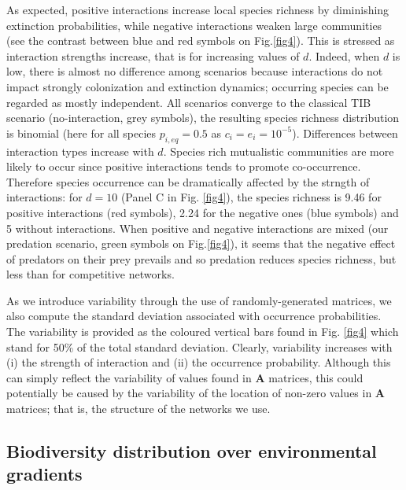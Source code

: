 As expected, positive interactions increase local species richness by diminishing extinction probabilities, while negative interactions weaken large communities (see the contrast between blue and red symbols on Fig.\ref{fig4}). This is stressed as interaction strengths increase, that is for increasing values of $d$. Indeed, when $d$ is low, there is almost no difference among scenarios because interactions do not impact strongly colonization and extinction dynamics; occurring species can be regarded as mostly independent. All scenarios converge to the classical TIB scenario (no-interaction, grey symbols), the resulting species richness distribution is binomial (here for all species $p_{i,eq}=0.5$ as $c_i=e_i=10^{-5}$). Differences between interaction types increase with $d$. Species rich mutualistic communities are more likely to occur since positive interactions tends to promote co-occurrence. Therefore species occurrence can be dramatically affected by the strngth of interactions: for $d=10$ (Panel C in Fig. \ref{fig4}), the species richness is 9.46 for positive interactions (red symbols), 2.24 for the negative ones (blue symbols) and 5 without interactions. When positive and negative interactions are mixed (our predation scenario, green symbols on Fig.\ref{fig4}), it seems that the negative effect of predators on their prey prevails and so predation reduces species richness, but less than for competitive networks.

As we introduce variability through the use of randomly-generated matrices, we also compute the standard deviation associated with occurrence probabilities. The variability is provided as the coloured vertical bars found in Fig. \ref{fig4} which stand for 50\% of the total standard deviation. Clearly, variability increases with (i) the strength of interaction and (ii) the occurrence probability. Although this can simply reflect the variability of values found in $\mathbf{A}$ matrices, this could potentially be caused by the variability of the location of non-zero values in  $\mathbf{A}$ matrices; that is, the structure of the networks we use.



\subsection{Biodiversity distribution over environmental gradients}

